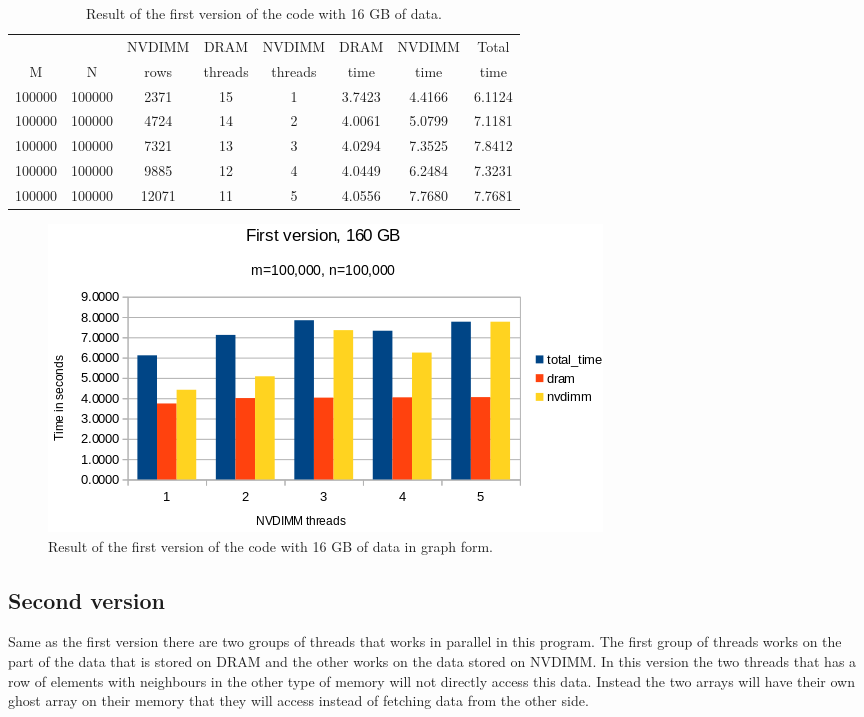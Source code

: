 \documentclass[12pt,a4paper,USenglish]{article}      %
\begin{document}
\begin{table}[!hbtp]
\centering
\begin{tabular}{ |c|c|c|c|c|c|c|c| }
\hline
&  & NVDIMM & DRAM & NVDIMM & DRAM & NVDIMM & Total \\
M & N & rows & threads & threads & time & time & time \\
\hline
100000 & 100000 & 2371 & 15 & 1 & 3.7423 & 4.4166 & 6.1124 \\
\hline
100000 & 100000 & 4724 & 14 & 2 & 4.0061 & 5.0799 & 7.1181 \\
\hline
100000 & 100000 & 7321 & 13 & 3 & 4.0294 & 7.3525 & 7.8412 \\
\hline
100000 & 100000 & 9885 & 12 & 4 & 4.0449 & 6.2484 & 7.3231 \\
\hline
100000 & 100000 & 12071 & 11 & 5 & 4.0556 & 7.7680 & 7.7681 \\
\hline
\end{tabular}
\caption{Result of the first version of the code with 16 GB of data.}
\label{tab:FirstVersion160GB}
\end{table}
\begin{figure}[!hbtp]
\includegraphics[scale=0.7]{Large_Array_test/First_version_160GB.png}
\caption{Result of the first version of the code with 16 GB of data in graph form.}
\label{fig:FirstVersion160GB}
\end{figure}

\clearpage
\subsection{Second version}
Same as the first version there are two groups of threads that works in parallel in this program. The first group of threads works on the part of the data that is stored on DRAM and the other works on the data stored on NVDIMM.
In this version the two threads that has a row of elements with neighbours in the other type of memory will not directly access this data. Instead the two arrays will have their own ghost array on their memory that they will access instead of fetching data from the other side. 
\end{document}
